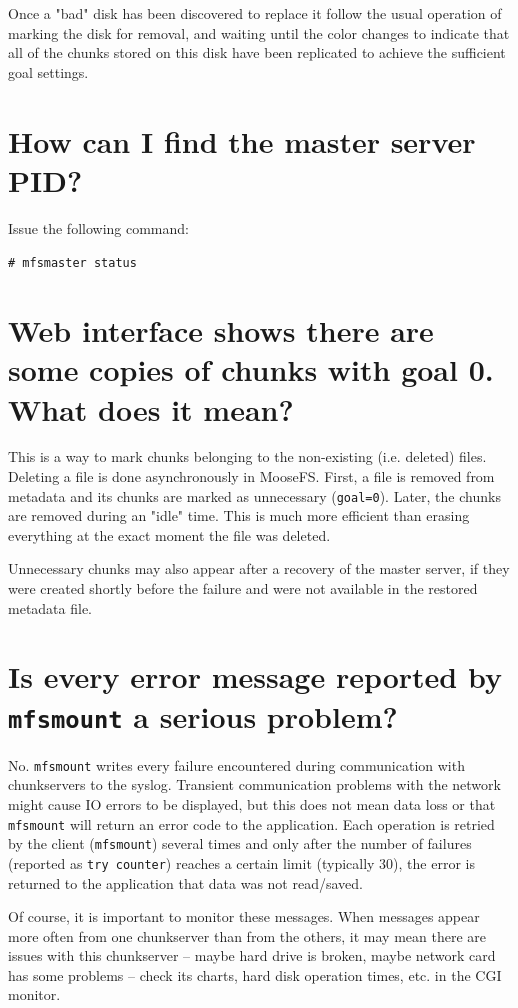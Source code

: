 \documentclass[a4paper,11pt,english]{report}
\def\code#1{\texttt{#1}}
\begin{document}
		Once a "bad" disk has been discovered to replace it follow the usual operation of marking the disk for removal, and waiting until the color changes to indicate that all of the chunks stored on this disk have been replicated to achieve the sufficient goal settings.
		
		
		\section{How can I find the master server PID?} 
		Issue the following command:

		\code{\# mfsmaster status}

		\section{Web interface shows there are some copies of chunks with goal 0. What does it mean?}
		This is a way to mark chunks belonging to the non-existing (i.e. deleted) files. Deleting a file is done asynchronously in MooseFS. First, a file is removed from metadata and its chunks are marked as unnecessary (\code{goal=0}). Later, the chunks are removed during an "idle" time. This is much more efficient than erasing everything at the exact moment the file was deleted.
		
		Unnecessary chunks may also appear after a recovery of the master server, if they were created shortly before the failure and were not available in the restored metadata file.

		 
		\section{Is every error message reported by \code{mfsmount} a serious problem?}
		No. \code{mfsmount} writes every failure encountered during communication with chunkservers to the syslog. Transient communication problems with the network might cause IO errors to be displayed, but this does not mean data loss or that \code{mfsmount} will return an error code to the application. Each operation is retried by the client (\code{mfsmount}) several times and only after the number of failures (reported as \code{try counter}) reaches a certain limit (typically 30), the error is returned to the application that data was not read/saved.
		
		Of course, it is important to monitor these messages. When messages appear more often from one chunkserver than from the others, it may mean there are issues with this chunkserver -- maybe hard drive is broken, maybe network card has some problems -- check its charts, hard disk operation times, etc. in the CGI monitor.
		
\end{document}
